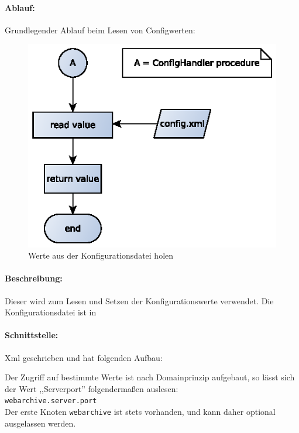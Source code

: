 \paragraph{Ablauf:}
\label{par:ablauf_}
Grundlegender Ablauf beim Lesen von Configwerten:
\begin{figure}[h]
	\centering
	\label{dia:design:backend:overview}
	\includegraphics[width=\textwidth]{design/data/getting_value.eps}
	\caption{Werte aus der Konfigurationsdatei holen}
\end{figure}



\paragraph{Beschreibung:}
\label{par:beschreibung_}
Dieser wird zum Lesen und Setzen der Konfigurationswerte verwendet. Die Konfigurationsdatei ist in 
\paragraph{Schnittstelle:}
\label{par:schnittstelle_}
Xml geschrieben und hat folgenden Aufbau:
    
Der Zugriff auf bestimmte Werte ist nach Domainprinzip aufgebaut, so lässt sich der Wert ,,Serverport'' folgendermaßen auslesen: \\
\texttt{webarchive.server.port} \\
Der erste Knoten \texttt{webarchive} ist stets vorhanden, und kann daher optional ausgelassen werden.


